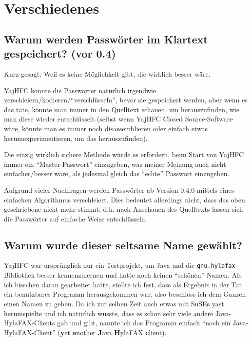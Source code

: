 \documentclass[a4paper,10pt,halfparskip,noparindent]{scrartcl}
\begin{document}
\section{Verschiedenes}

\subsection{Warum werden Passwörter im Klartext gespeichert? (vor 0.4)}

Kurz gesagt: Weil es keine Möglichkeit gibt, die wirklich besser wäre.

YajHFC könnte die Passwörter natürlich irgendwie verschleiern/kodieren/"`verschlüsseln"',
bevor sie gespeichert werden, aber wenn es das täte, könnte man immer in den Quelltext schauen,
um herauszufinden, wie man diese wieder entschlüsselt (selbst wenn YajHFC Closed Source-Software wäre,
könnte man es immer noch disassemblieren oder einfach etwas herumexperimentieren, um das
herauszufinden).

Die einzig wirklich sichere Methode würde es erfordern, beim Start von YajHFC immer ein "`Master-Passwort"'
einzugeben, was meiner Meinung auch nicht einfacher/besser wäre, als jedesmal gleich das "`echte"' Passwort
einzugeben.

Aufgrund vieler Nachfragen werden Passwörter ab Version 0.4.0 mittels eines einfachen Algorithmus verschleiert.
Dies bedeutet allerdings nicht, dass das oben geschriebene nicht mehr stimmt, d.h. nach Anschauen des Quelltexts lassen sich die Passwörter auf einfache Weise entschlüsseln.


\subsection{Warum wurde dieser seltsame Name gewählt?}

YajHFC war ursprünglich nur ein Testprojekt, um Java und die \texttt{gnu.hylafax}-Bibliothek besser
kennenzulernen und hatte noch keinen "`schönen"' Namen.
Als ich bisschen daran gearbeitet hatte, stellte ich fest, dass als Ergebnis in der Tat ein benutzbares
Programm herausgekommen war, also beschloss ich dem Ganzen einen Namen zu geben.
Da ich zur selben Zeit auch etwas mit SuSEs yast herumspielte und ich natürlich wusste, dass es schon sehr viele
andere Java-HylaFAX-Clients gab und gibt, nannte ich das Programm einfach "`noch ein Java-HylaFAX-Client"'
(\textbf{y}et \textbf{a}nother \textbf{J}ava \textbf{H}ylaFAX \textbf{c}lient).
\end{document}

